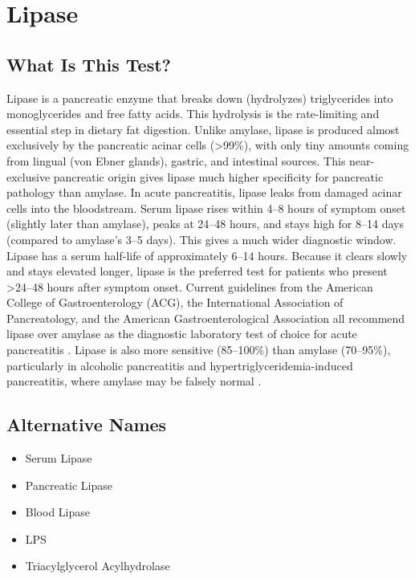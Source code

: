 \chapter{Lipase}

\section*{What Is This Test?}
Lipase is a pancreatic enzyme that breaks down (hydrolyzes) triglycerides into monoglycerides and free fatty acids. This hydrolysis is the rate-limiting and essential step in dietary fat digestion. Unlike amylase, lipase is produced almost exclusively by the pancreatic acinar cells (>99\%), with only tiny amounts coming from lingual (von Ebner glands), gastric, and intestinal sources. This near-exclusive pancreatic origin gives lipase much higher specificity for pancreatic pathology than amylase. In acute pancreatitis, lipase leaks from damaged acinar cells into the bloodstream. Serum lipase rises within 4--8 hours of symptom onset (slightly later than amylase), peaks at 24--48 hours, and stays high for 8--14 days (compared to amylase's 3--5 days). This gives a much wider diagnostic window. Lipase has a serum half-life of approximately 6--14 hours. Because it clears slowly and stays elevated longer, lipase is the preferred test for patients who present >24--48 hours after symptom onset. Current guidelines from the American College of Gastroenterology (ACG), the International Association of Pancreatology, and the American Gastroenterological Association all recommend lipase over amylase as the diagnostic laboratory test of choice for acute pancreatitis \cite{iap2013evidence,tietz2023textbook}. Lipase is also more sensitive (85--100\%) than amylase (70--95\%), particularly in alcoholic pancreatitis and hypertriglyceridemia-induced pancreatitis, where amylase may be falsely normal \cite{yadav2002critical}.

\section*{Alternative Names}
\begin{itemize}
  \item Serum Lipase
  \item Pancreatic Lipase
  \item Blood Lipase
  \item LPS
  \item Triacylglycerol Acylhydrolase
\end{itemize}
